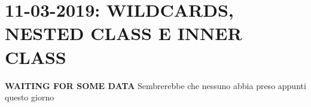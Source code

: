 

\newpage
\section{11-03-2019: WILDCARDS, NESTED CLASS E INNER CLASS}
\textbf{WAITING FOR SOME DATA} \newline
Sembrerebbe che nessuno abbia preso appunti questo giorno \newline






